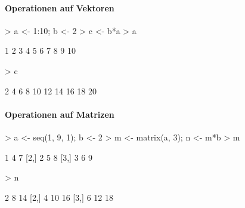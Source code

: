 \paragraph{Operationen auf Vektoren}
\begin{Schunk}
\begin{Sinput}
> a <- 1:10; b <- 2
> c <- b*a
> a
\end{Sinput}
\begin{Soutput}
 [1]  1  2  3  4  5  6  7  8  9 10
\end{Soutput}
\begin{Sinput}
> c
\end{Sinput}
\begin{Soutput}
 [1]  2  4  6  8 10 12 14 16 18 20
\end{Soutput}
\end{Schunk}

\paragraph{Operationen auf Matrizen}
\begin{Schunk}
\begin{Sinput}
> a <- seq(1, 9, 1); b <- 2
> m <- matrix(a, 3); n <- m*b
> m
\end{Sinput}
\begin{Soutput}
     [,1] [,2] [,3]
[1,]    1    4    7
[2,]    2    5    8
[3,]    3    6    9
\end{Soutput}
\begin{Sinput}
> n
\end{Sinput}
\begin{Soutput}
     [,1] [,2] [,3]
[1,]    2    8   14
[2,]    4   10   16
[3,]    6   12   18
\end{Soutput}
\end{Schunk}
